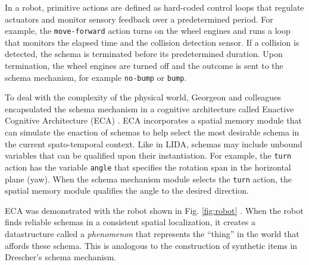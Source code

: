 \documentclass[runningheads]{llncs}
\begin{document}
In a robot, primitive actions are defined as hard-coded control loops that regulate actuators and monitor sensory feedback over a predetermined period. 
For example, the \texttt{move-forward} action turns on the wheel engines and runs a loop that monitors the elapsed time and the collision detection sensor. 
If a collision is detected, the schema is terminated before its predetermined duration. 
Upon termination, the wheel engines are turned off and the outcome is sent to the schema mechanism, for example \texttt{no-bump} or \texttt{bump}.

To deal with the complexity of the physical world, Georgeon and colleagues encapsulated the schema mechanism in a cognitive architecture called Enactive Cognitive Architecture (ECA) \cite{georgeon_eca_2013}.
ECA incorporates a spatial memory module that can simulate the enaction of schemas to help select the most desirable schema in the current spato-temporal context. 
Like in LIDA, schemas may include unbound variables that can be qualified upon their instantiation. 
For example, the \texttt{turn} action has the variable \texttt{angle} that specifies the rotation span in the horizontal plane (yaw).
When the schema mechanism module selects the \texttt{turn} action, the spatial memory module qualifies the angle to the desired direction.

ECA was demonstrated with the robot shown in Fig. \ref{fig:robot} \cite{georgeon_artificial_2024}.
When the robot finds reliable schemas in a consistent spatial localization, it creates a datastructure called a \textit{phenomenon} that represents the ``thing'' in the world that affords these schema.
This is analogous to the construction of synthetic items in Drescher's schema mechanism.
\end{document}
